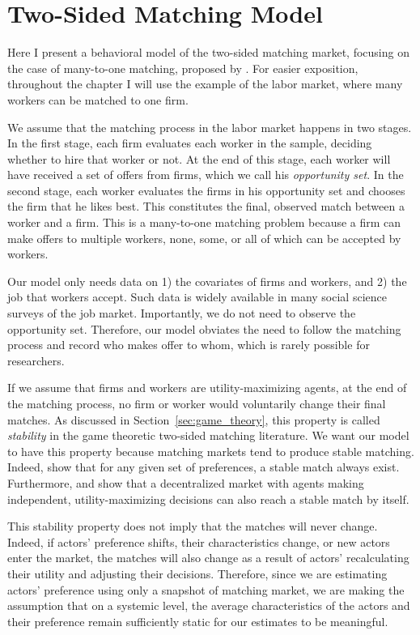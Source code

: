 \chapter{Two-Sided Matching Model}
\label{chap:model}

Here I present a behavioral model of the two-sided matching market, focusing on
the case of many-to-one matching, proposed by \cite{Logan1996}. For easier
exposition, throughout the chapter I will use the example of the labor market,
where many workers can be matched to one firm.

We assume that the matching process in the labor market happens in two stages.
In the first stage, each firm evaluates each worker in the sample, deciding
whether to hire that worker or not. At the end of this stage, each worker will
have received a set of offers from firms, which we call his \textit{opportunity
  set}. In the second stage, each worker evaluates the firms in his opportunity
set and chooses the firm that he likes best. This constitutes the final,
observed match between a worker and a firm. This is a many-to-one matching
problem because a firm can make offers to multiple workers, none, some, or all
of which can be accepted by workers.

Our model only needs data on 1) the covariates of firms and workers, and 2) the
job that workers accept. Such data is widely available in many social science
surveys of the job market. Importantly, we do not need to observe the opportunity
set. Therefore, our model obviates the need to follow the matching process and
record who makes offer to whom, which is rarely possible for researchers.

If we assume that firms and workers are utility-maximizing agents, at the end of
the matching process, no firm or worker would voluntarily change their final
matches. As discussed in Section~\ref{sec:game_theory}, this property is called
\textit{stability} in the game theoretic two-sided matching literature. We want
our model to have this property because matching markets tend to produce stable
matching. Indeed, \citet{Roth1992} show that for any given set of preferences, a
stable match always exist. Furthermore, \citet{Roth2016} and \citet{Adachi2003}
show that a decentralized market with agents making independent,
utility-maximizing decisions can also reach a stable match by itself.

This stability property does not imply that the matches will never change.
Indeed, if actors' preference shifts, their characteristics change, or new
actors enter the market, the matches will also change as a result of actors'
recalculating their utility and adjusting their decisions. Therefore, since we
are estimating actors' preference using only a snapshot of matching market, we
are making the assumption that on a systemic level, the average characteristics
of the actors and their preference remain sufficiently static for our estimates
to be meaningful.

